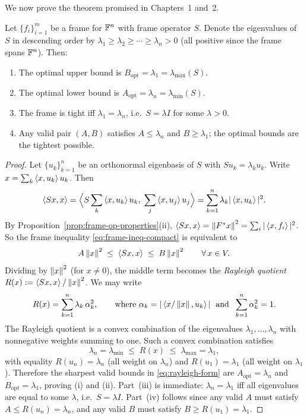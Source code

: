 We now prove the theorem promised in Chapters~1 and~2.

\begin{theorem}
\label{thm:frame-bounds-eigenvalues}
Let $\{f_i\}_{i=1}^m$ be a frame for $\mathbb{F}^n$ with frame operator $S$.
Denote the eigenvalues of $S$ in descending order by
$\lambda_1\ge\lambda_2\ge\cdots\ge\lambda_n>0$ (all positive since the
frame spans $\mathbb{F}^n$). Then:
\begin{enumerate}[label=(\roman*)]
  \item The optimal upper bound is $B_{\mathrm{opt}}=\lambda_1=\lambda_{\max}(S)$.
  \item The optimal lower bound is $A_{\mathrm{opt}}=\lambda_n=\lambda_{\min}(S)$.
  \item The frame is tight iff $\lambda_1=\lambda_n$, i.e.\ $S=\lambda I$
        for some $\lambda>0$.
  \item Any valid pair $(A,B)$ satisfies $A\le\lambda_n$ and
        $B\ge\lambda_1$; the optimal bounds are the tightest possible.
\end{enumerate}
\end{theorem}

\begin{proof}
Let $\{u_k\}_{k=1}^n$ be an orthonormal eigenbasis of $S$ with $Su_k=\lambda_k
u_k$. Write $x=\sum_k\left\langle x, u_k \right\rangle u_k$. Then
\[
  \left\langle Sx, x \right\rangle
  = \Bigl\langle S\sum_k\left\langle x, u_k \right\rangle u_k,\;\sum_j\left\langle x, u_j \right\rangle u_j\Bigr\rangle
  = \sum_{k=1}^n \lambda_k|\left\langle x, u_k \right\rangle|^2.
\]
By Proposition~\ref{prop:frame-op-properties}(ii), $\left\langle Sx, x \right\rangle=\left\| F^*x \right\|^2
=\sum_i|\left\langle x, f_i \right\rangle|^2$. So the frame inequality \eqref{eq:frame-ineq-compact}
is equivalent to
\begin{equation}
\label{eq:rayleigh-form}
  A\left\| x \right\|^2 \;\le\; \left\langle Sx, x \right\rangle \;\le\; B\left\| x \right\|^2
  \qquad\forall\,x\in V.
\end{equation}
Dividing by $\left\| x \right\|^2$ (for $x\ne 0$), the middle term becomes the
\emph{Rayleigh quotient} $R(x) := \left\langle Sx, x \right\rangle/\left\| x \right\|^2$. We may write
\[
  R(x) = \sum_{k=1}^n \lambda_k\,\alpha_k^2, \qquad
  \text{where } \alpha_k = |\left\langle x/\left\| x \right\|, u_k \right\rangle|
  \;\text{ and }\; \sum_{k=1}^n \alpha_k^2 = 1.
\]
The Rayleigh quotient is a convex combination of the eigenvalues
$\lambda_1,\ldots,\lambda_n$ with nonneg\-ative weights summing to one.
Such a convex combination satisfies
\[
  \lambda_n = \lambda_{\min} \;\le\; R(x) \;\le\; \lambda_{\max} = \lambda_1,
\]
with equality $R(u_n)=\lambda_n$ (all weight on $\lambda_n$) and
$R(u_1)=\lambda_1$ (all weight on $\lambda_1$). Therefore the sharpest
valid bounds in \eqref{eq:rayleigh-form} are $A_{\mathrm{opt}}=\lambda_n$ and
$B_{\mathrm{opt}}=\lambda_1$, proving (i) and (ii). Part~(iii) is
immediate: $\lambda_n=\lambda_1$ iff all eigenvalues are equal to some
$\lambda$, i.e.\ $S=\lambda I$. Part~(iv) follows since any valid $A$
must satisfy $A\le R(u_n)=\lambda_n$, and any valid $B$ must satisfy
$B\ge R(u_1)=\lambda_1$.
\end{proof}

